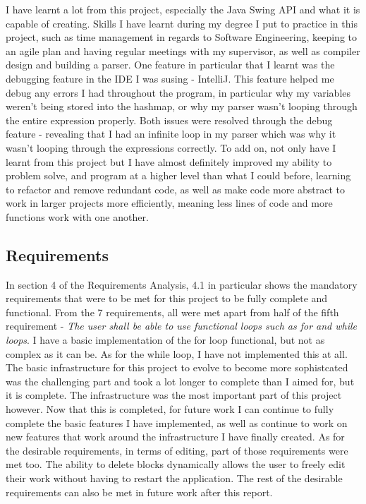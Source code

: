 \documentclass[a4paper, 12pt]{article}
\begin{document}
        I have learnt a lot from this project, especially the Java Swing API and what it is
        capable of creating. Skills I have learnt during my degree I put to practice in this
        project, such as time management in regards to Software Engineering, keeping to an
        agile plan and having regular meetings with my supervisor, as well as compiler design
        and building a parser. One feature in particular that I learnt was the debugging feature
        in the IDE I was susing - IntelliJ. This feature helped me debug any errors I had
        throughout the program, in particular why my variables weren't being stored into the
        hashmap, or why my parser wasn't looping through the entire expression properly. Both
        issues were resolved through the debug feature - revealing that I had an infinite loop
        in my parser which was why it wasn't looping through the expressions correctly.
        To add on, not only have I learnt from this project but I have almost definitely
        improved my ability to problem solve, and program at a higher level than what I could before,
        learning to refactor and remove redundant code, as well as make code more abstract to work
        in larger projects more efficiently, meaning less lines of code and more functions work
        with one another. \\ 

    \subsection{Requirements}
        In section 4 of the Requirements Analysis, 4.1 in particular shows the mandatory
        requirements that were to be met for this project to be fully complete and functional.
        From the 7 requirements, all were met apart from half of the fifth requirement -
        \textit{The user shall be able to use functional loops such as for and while loops}.
        I have a basic implementation of the for loop functional, but not as complex as it can
        be. As for the while loop, I have not implemented this at all. The basic infrastructure
        for this project to evolve to become more sophistcated was the challenging part and
        took a lot longer to complete than I aimed for, but it is complete. The infrastructure
        was the most important part of this project however. Now that this is completed, for
        future work I can continue to fully complete the basic features I have implemented,
        as well as continue to work on new features that work around the infrastructure I have
        finally created. As for the desirable requirements, in terms of editing, part of those requirements were
        met too. The ability to delete blocks dynamically allows the user to freely edit their
        work without having to restart the application. The rest of the desirable requirements
        can also be met in future work after this report.
\end{document}
